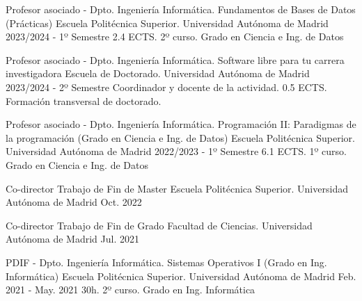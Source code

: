 \begin{cventries}
  \cventry
	{Profesor asociado - Dpto. Ingeniería Informática.} %
	{Fundamentos de Bases de Datos (Prácticas)} %
	{Escuela Politécnica Superior. Universidad Autónoma de Madrid} %
	{2023/2024 - 1º Semestre} %
	{2.4 ECTS. 2º curso. Grado en Ciencia e Ing. de Datos}

  \cventry
	{Profesor asociado - Dpto. Ingeniería Informática.} %
	{Software libre para tu carrera investigadora} %
	{Escuela de Doctorado. Universidad Autónoma de Madrid} %
	{2023/2024 - 2º Semestre} %
	{Coordinador y docente de la actividad. 0.5 ECTS. Formación transversal de doctorado.}

  \cventry
    {Profesor asociado - Dpto. Ingeniería Informática.} %
    {Programación II: Paradigmas de la programación (Grado en Ciencia e Ing. de Datos)} %
    {Escuela Politécnica Superior. Universidad Autónoma de Madrid} %
    {2022/2023 - 1º Semestre} %
    {6.1 ECTS. 1º curso. Grado en Ciencia e Ing. de Datos}
    

  \cventry
	{Co-director} %
	{Trabajo de Fin de Master} %
	{Escuela Politécnica Superior. Universidad Autónoma de Madrid} %
	{Oct. 2022} %
	{
		\begin{cvitems} %
			\item {}
		\end{cvitems}
	}

  \cventry
	{Co-director} %
	{Trabajo de Fin de Grado} %
	{Facultad de Ciencias. Universidad Autónoma de Madrid} %
	{Jul. 2021} %
	{
		\begin{cvitems} %
			\item {
			}
		\end{cvitems}
	}

  \cventry
    {PDIF - Dpto. Ingeniería Informática.} %
    {Sistemas Operativos I (Grado en Ing. Informática)} %
    {Escuela Politécnica Superior. Universidad Autónoma de Madrid} %
    {Feb. 2021 - May. 2021} %
    {30h. 2º curso. Grado en Ing. Informática}
    

\end{cventries}

